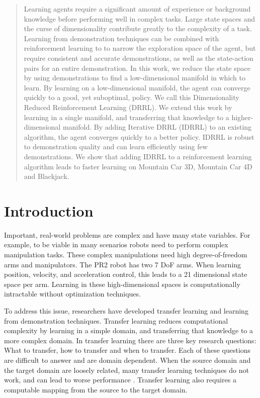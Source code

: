 \documentclass[10pt,a4paper]{article}
\begin{document}
\maketitle
\begin{abstract}
Learning agents require a significant amount of experience or background knowledge before performing well in complex tasks. Large state spaces and the curse of dimensionality contribute greatly to the complexity of a task. Learning from demonstration techniques can be combined with reinforcement learning to to narrow the exploration space of the agent, but require consistent and accurate demonstrations, as well as the state-action pairs for an entire demonstration. In this work, we reduce the state space by using demonstrations to find a low-dimensional manifold in which to learn. By learning on a low-dimensional manifold, the agent can converge quickly to a good, yet suboptimal, policy. We call this Dimensionality Reduced Reinforcement Learning (DRRL). We extend this work by learning in a single manifold, and transferring that knowledge to a higher-dimensional manifold. By adding Iterative DRRL (IDRRL) to an existing algorithm, the agent converges quickly to a better policy. IDRRL is robust to demonstration quality and can learn efficiently using few demonstrations. We show that adding IDRRL to a reinforcement learning algorithm leads to faster learning on Mountain Car 3D, Mountain Car 4D and Blackjack.

\end{abstract}
\section{Introduction}
Important, real-world problems are complex and have many state variables. For example, to be viable in many scenarios robots need to perform complex manipulation tasks. These complex manipulations need high degree-of-freedom arms and manipulators. The PR2 robot has two 7 DoF arms. When learning position, velocity, and acceleration control, this leads to a 21 dimensional state space per arm. Learning in these high-dimensional spaces is computationally intractable without optimization techniques.

To address this issue, researchers have developed transfer learning \cite{Taylor:2009:TLR:1577069.1755839} and learning from demonstration \cite{Argall:2009:SRL:1523530.1524008} techniques. Transfer learning reduces computational complexity by learning in a simple domain, and transferring that knowledge to a more complex domain. In transfer learning there are three key research questions: What to transfer, how to transfer and when to transfer. Each of these questions are difficult to answer and are domain dependent. When the source domain and the target domain are loosely related, many transfer learning techniques do not work, and can lead to worse performance \cite{Taylor:2009:TLR:1577069.1755839}. Transfer learning also requires a computable mapping from the source to the target domain.
\end{document}
